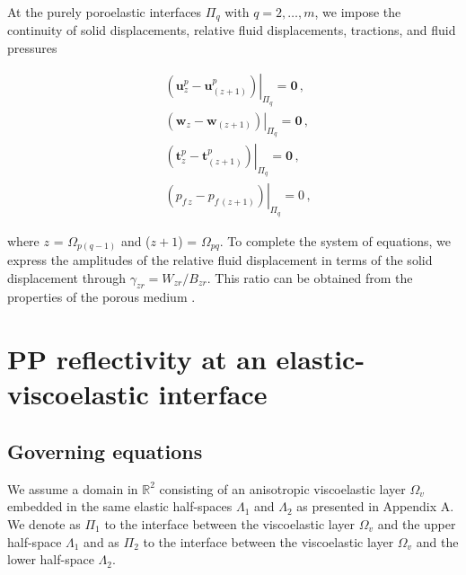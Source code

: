 \documentclass[draft]{agujournal2019}
\begin{document}
At the purely poroelastic interfaces $\Pi_q$ with $q=2,\dots,m$, we impose the continuity of solid displacements, relative fluid displacements, tractions, and fluid pressures \cite{Deresiewicz1963}
\begin{linenomath*}
\begin{equation}\label{Eq.19}
\begin{split}
&  \left. \left( \bm{u}_z^p -  \bm{u}_{(z+1)}^p \right) \right \rvert_{\Pi_q} = \bm{0} \,, \\
&  \left. \left(  \bm{w}_z -  \bm{w}_{(z+1)} \right) \right \rvert_{\Pi_q} = \bm{0} \,, \\
& \left . \left(  \bm{t}_z^p  - \bm{t}_{(z+1)}^p \right) \right \rvert_{\Pi_q}= \bm{0} \,,\\
&  \left. \left(  p_{f\,z} -  p_{f\, (z+1)} \right) \right \rvert_{\Pi_q} = 0 \,,
\end{split}
\end{equation}
\end{linenomath*}
where $z$ = $\Omega_{p(q-1)}$ and ($z+1$) = $\Omega_{pq}$. 
To complete the system of equations, we express the amplitudes of the relative fluid displacement in terms of the solid displacement through
 $\gamma_{zr}=W_{zr}/B_{zr}$. This ratio can be  obtained from the properties of the porous medium \cite{Barbosa2016}.


\section{PP reflectivity at an elastic-viscoelastic interface}
\subsection{Governing equations}
We assume a  domain in $\mathbb R^2$ consisting of an anisotropic viscoelastic layer $\Omega_v$  
embedded in the same elastic half-spaces $\Lambda_1$ and $\Lambda_2$ as presented in Appendix A. We denote as $\Pi_1$ to the interface between the viscoelastic layer $\Omega_v$ and the upper half-space $\Lambda_1$ and as $\Pi_2$ to the interface between the viscoelastic layer $\Omega_v$ and the lower half-space $\Lambda_2$.
 
\end{document}
